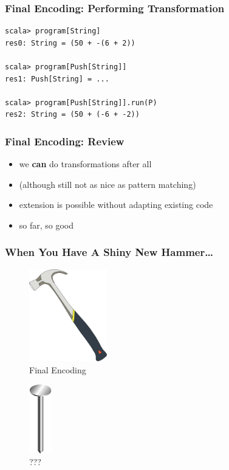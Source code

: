 \documentclass{beamer}
\begin{document}
\begin{frame}[fragile]
  \frametitle{Final Encoding: Performing Transformation}
\begin{verbatim}
scala> program[String]
res0: String = (50 + -(6 + 2))

scala> program[Push[String]]
res1: Push[String] = ...

scala> program[Push[String]].run(P)
res2: String = (50 + (-6 + -2))
\end{verbatim}
\end{frame}

\begin{frame}
  \frametitle{Final Encoding: Review}
  \begin{itemize}
  \item we \textbf{can} do transformations after all
  \item (although still not as nice as pattern matching)
  \item extension is possible without adapting existing code
  \item so far, so good
  \end{itemize}
\end{frame}

\begin{frame}
  \frametitle{When You Have A Shiny New Hammer\ldots}
  \begin{minipage}{0.48\linewidth}
  \begin{figure}
    \centering
    \includegraphics[height=4cm]{../pics/hammer.png}
    \caption{Final Encoding}
  \end{figure}
  \end{minipage}
  \begin{minipage}{0.48\linewidth}
    \begin{figure}
      \centering \includegraphics[height=3cm]{../pics/nail.png}
      \caption{???}
    \end{figure}
  \end{minipage}
\end{frame}
\end{document}

